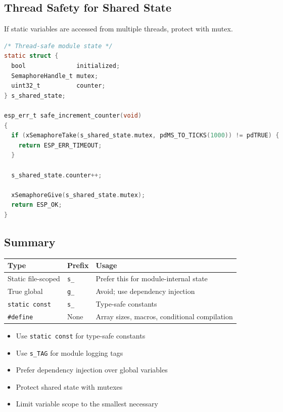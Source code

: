 \subsection{Thread Safety for Shared State}

If static variables are accessed from multiple threads, protect with mutex.

\begin{lstlisting}[language=C]
/* Thread-safe module state */
static struct {
  bool              initialized;
  SemaphoreHandle_t mutex;
  uint32_t          counter;
} s_shared_state;

esp_err_t safe_increment_counter(void)
{
  if (xSemaphoreTake(s_shared_state.mutex, pdMS_TO_TICKS(1000)) != pdTRUE) {
    return ESP_ERR_TIMEOUT;
  }
  
  s_shared_state.counter++;
  
  xSemaphoreGive(s_shared_state.mutex);
  return ESP_OK;
}
\end{lstlisting}

\subsection{Summary}

\begin{center}
\begin{tabular}{|l|l|l|}
\hline
\textbf{Type} & \textbf{Prefix} & \textbf{Usage} \\
\hline
Static file-scoped & \texttt{s\_} & Prefer this for module-internal state \\
\hline
True global & \texttt{g\_} & Avoid; use dependency injection \\
\hline
\texttt{static const} & \texttt{s\_} & Type-safe constants \\
\hline
\texttt{\#define} & None & Array sizes, macros, conditional compilation \\
\hline
\end{tabular}
\end{center}

\begin{itemize}
    \item Use \texttt{static const} for type-safe constants
    \item Use \texttt{s\_TAG} for module logging tags
    \item Prefer dependency injection over global variables
    \item Protect shared state with mutexes
    \item Limit variable scope to the smallest necessary
\end{itemize}



